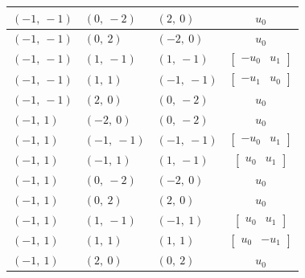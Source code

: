 \documentclass[11pt]{article}
\theoremstyle{definition}
\begin{document}
\begin{longtable}{|l|l|l|c|}
    \hline
    $\left( -1, \  -1\right)$ & $\left( 0, \  -2\right)$ & $\left( 2, \  0\right)$ & $u_{0}$ \\
    \hline
    $\left( -1, \  -1\right)$ & $\left( 0, \  2\right)$ & $\left( -2, \  0\right)$ & $u_{0}$ \\
    \hline
    $\left( -1, \  -1\right)$ & $\left( 1, \  -1\right)$ & $\left( 1, \  -1\right)$ & $\left[\begin{matrix}- u_{0} & u_{1}\end{matrix}\right]$ \\
    \hline
    $\left( -1, \  -1\right)$ & $\left( 1, \  1\right)$ & $\left( -1, \  -1\right)$ & $\left[\begin{matrix}- u_{1} & u_{0}\end{matrix}\right]$ \\
    \hline
    $\left( -1, \  -1\right)$ & $\left( 2, \  0\right)$ & $\left( 0, \  -2\right)$ & $u_{0}$ \\
    \hline
    $\left( -1, \  1\right)$ & $\left( -2, \  0\right)$ & $\left( 0, \  -2\right)$ & $u_{0}$ \\
    \hline
    $\left( -1, \  1\right)$ & $\left( -1, \  -1\right)$ & $\left( -1, \  -1\right)$ & $\left[\begin{matrix}- u_{0} & u_{1}\end{matrix}\right]$ \\
    \hline
    $\left( -1, \  1\right)$ & $\left( -1, \  1\right)$ & $\left( 1, \  -1\right)$ & $\left[\begin{matrix}u_{0} & u_{1}\end{matrix}\right]$ \\
    \hline
    $\left( -1, \  1\right)$ & $\left( 0, \  -2\right)$ & $\left( -2, \  0\right)$ & $u_{0}$ \\
    \hline
    $\left( -1, \  1\right)$ & $\left( 0, \  2\right)$ & $\left( 2, \  0\right)$ & $u_{0}$ \\
    \hline
    $\left( -1, \  1\right)$ & $\left( 1, \  -1\right)$ & $\left( -1, \  1\right)$ & $\left[\begin{matrix}u_{0} & u_{1}\end{matrix}\right]$ \\
    \hline
    $\left( -1, \  1\right)$ & $\left( 1, \  1\right)$ & $\left( 1, \  1\right)$ & $\left[\begin{matrix}u_{0} & - u_{1}\end{matrix}\right]$ \\
    \hline
    $\left( -1, \  1\right)$ & $\left( 2, \  0\right)$ & $\left( 0, \  2\right)$ & $u_{0}$ \\

\end{longtable}
\end{document}

